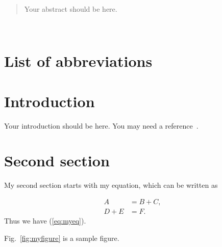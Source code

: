 \documentclass[11pt,a4paper,onecolumn,oneside]{report}
\begin{document}
    

    \begin{abstract}
    Your abstract should be here. \vfill
    \end{abstract}

\clearpage

\hbox{ }
\thispagestyle{empty}
\clearpage

\tableofcontents{}
\thispagestyle{empty}
\vfill
\clearpage

\listoffigures{}
\thispagestyle{empty}
\clearpage

\setcounter{page}{1}

    \section*{List of abbreviations}
    \newpage

    \section{Introduction}

        Your introduction should be here. You may need a reference~\cite{ref_sample}.
    \newpage

    \section{Second section}
        My second section starts with my equation, which can be written as

        \begin{equation}\label{eq:myeq}
        \begin{split}
        	A 		&= B + C, \\
            D + E	&= F.
        \end{split}
        \end{equation}
        Thus we have (\ref{eq:myeq}).

        Fig.~\ref{fig:myfigure} is a sample figure.
\end{document}
